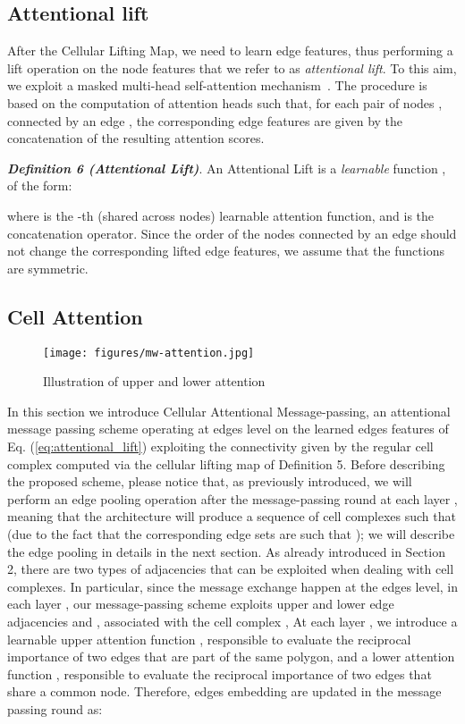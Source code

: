 \documentclass{article}
\begin{document}
\subsection{Attentional lift}
 After the Cellular Lifting Map, we need to learn edge features, thus performing a lift operation on the node features that we refer to as \emph{attentional lift}. To this aim, we exploit a masked multi-head self-attention mechanism~\cite{velivckovic2017graph}. The procedure is based on the computation of  attention heads such that, for each pair of nodes , connected by an edge , the corresponding edge features  are given by the concatenation of the resulting attention scores.

\textit{\textbf{Definition 6 (Attentional Lift)}}. An Attentional Lift is a \emph{learnable} function ,  of the form: 

where  is the -th (shared across nodes) learnable attention function, and  is the concatenation operator. Since the order of the nodes connected by an edge should not change the corresponding lifted edge features, we assume that the functions  are symmetric. 

\subsection{Cell Attention}

\begin{figure}[t]
    \centering
    \texttt{[image: figures/mw-attention.jpg]}
    \caption{Illustration of upper and lower attention}
    \label{fig:att}
\end{figure}


In this section we introduce Cellular Attentional Message-passing, an attentional message passing scheme operating at edges level on the learned edges features of Eq. (\ref{eq:attentional_lift}) exploiting the connectivity given by the regular cell complex  computed via the cellular lifting map of Definition 5. Before describing the proposed scheme, please notice that, as previously introduced, we will perform an edge pooling operation after the message-passing round at each layer , meaning that the architecture will produce a sequence of cell complexes  such that   (due to the fact that the corresponding edge sets are such that ); we will describe the edge pooling in details in the next section. As already introduced in Section 2, there are two types of adjacencies that can be exploited when dealing with cell complexes. In particular, since the message exchange happen at the edges level, in each layer , our message-passing scheme exploits upper and lower edge adjacencies  and , associated with the cell complex ,  At each layer , we introduce a learnable upper attention function , responsible to evaluate the reciprocal importance of two edges that are part of the same polygon, and a lower attention function , responsible to evaluate the reciprocal importance of two edges that share a common node. Therefore, edges embedding are updated in the  message passing round as:
\end{document}
